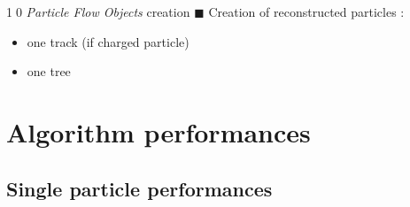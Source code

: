 \documentclass[8pt]{beamer}
\begin{document}
\begin{frame}
\begin{minipage}{0.415\linewidth}
\begin{center}
      \end{center}
      \begin{block}{\textcircled{{\footnotesize 10}} \textit{Particle Flow Objects} creation}
        $\blacksquare$ Creation of reconstructed particles :
        \begin{itemize}
          \item one track (if charged particle)
          \item one tree
        \end{itemize}
      \end{block} 
    \end{minipage}
  \end{frame}
  
  
  \section{Algorithm performances}
  
  \subsection{Single particle performances}
  
\end{document}
